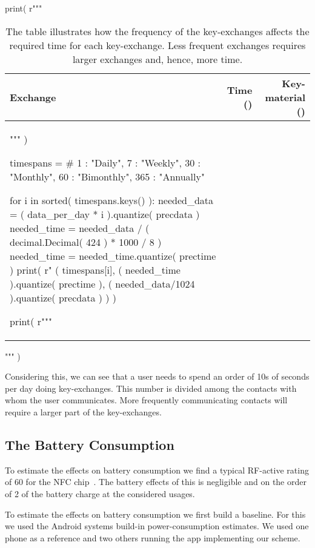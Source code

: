 \begin{table}
  \centering
  \caption{%
    The table illustrates how the frequency of the key-exchanges affects the 
    required time for each key-exchange.
    Less frequent exchanges requires larger exchanges and, hence, more time.
  }
  \label{tbl:MeetingsTradeoff}
  \begin{pycode}[random]
print( r"""
\begin{tabular}{lrr}
  Exchange &
  Time (\second) &
  Key-material (\kibi\byte) \\
  \toprule
""" )

timespans = {#
  1 : "Daily",
  7 : "Weekly",
  30 : "Monthly",
  60 : "Bimonthly",
  365 : "Annually"
}

for i in sorted( timespans.keys() ):
  needed_data = ( data_per_day * i ).quantize( precdata )
  needed_time = needed_data / ( decimal.Decimal( 424 ) * 1000 / 8 )
  needed_time = needed_time.quantize( prectime )
  print( r"%
  ( timespans[i],
    ( needed_time ).quantize( prectime ),
    ( needed_data/1024 ).quantize( precdata )
    ) )

print( r"""
  \bottomrule
\end{tabular}
""" )
  \end{pycode}
\end{table}

Considering this, we can see that a user needs to spend an order of 10s of 
seconds per day doing key-exchanges.
This number is divided among the contacts with whom the user communicates.
More frequently communicating contacts will require a larger part of the 
key-exchanges.

\subsection{The Battery Consumption}
\label{sec:Battery}
To estimate the effects on battery consumption we find a typical RF-active 
rating of \unit{60}{\milli\ampere} for the NFC chip~\cite{NFCController}.
The battery effects of this is negligible and on the order of 
\unit{2}{\text{\textperthousand}} of the battery charge at the considered 
usages.

To estimate the effects on battery consumption we first build a baseline.
For this we used the Android systems build-in power-consumption estimates.
We used one phone as a reference and two others running the app implementing 
our scheme.

